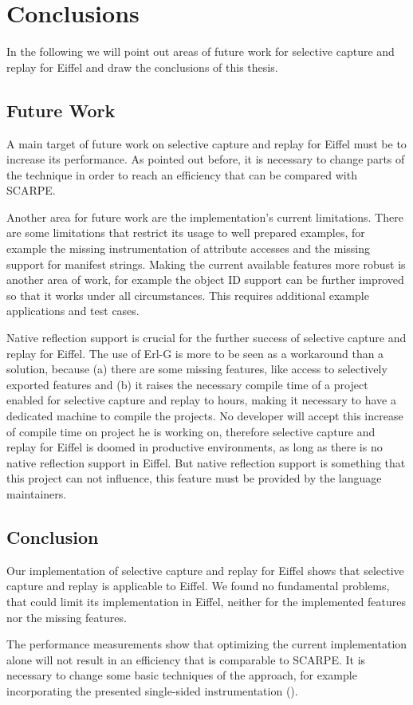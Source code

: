 \chapter{Conclusions}
In the following we will point out areas of future work for selective capture and replay for Eiffel and draw the conclusions of this thesis.


\section{Future Work}
A main target of future work on selective capture and replay for Eiffel must be to increase its performance. As pointed out before, it is necessary to change parts of the technique in order to reach an efficiency that can be compared with SCARPE.

Another area for future work are the implementation's current limitations. There are some limitations that restrict its usage to well prepared examples, for example the missing instrumentation of attribute accesses and the missing support for manifest strings. Making the current available features more robust is another area of work, for example the object ID support can be further improved so that it works under all circumstances. This requires additional example applications and test cases.

Native reflection support is crucial for the further success of selective capture and replay for Eiffel. The use of Erl-G is more to be seen as a workaround than a solution, because (a) there are some missing features, like access to selectively exported features and (b) it raises the necessary compile time of a project enabled for selective capture and replay to hours, making it necessary to have a dedicated machine to compile the projects. No developer will accept this increase of compile time on project he is working on, therefore selective capture and replay for Eiffel is doomed in productive environments, as long as there is no native reflection support in Eiffel. But native reflection support is something that this project can not influence, this feature must be provided by the language maintainers.


\section{Conclusion}
Our implementation of selective capture and replay for Eiffel shows that selective capture and replay is applicable to Eiffel. We found no fundamental problems, that could limit its implementation in Eiffel, neither for the implemented features nor the missing features.

The performance measurements show that optimizing the current implementation alone will not result in an efficiency that is comparable to SCARPE. It is necessary to change some basic techniques of the approach, for example incorporating the presented single-sided instrumentation ().